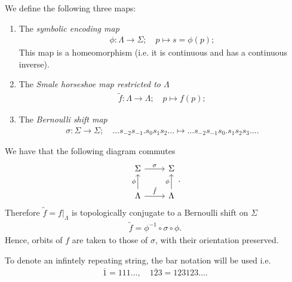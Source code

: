 \begin{definition}
	We define the following three maps:
	\begin{enumerate}
		
\item The \emph{symbolic encoding map}
	\begin{align}
		\boxed{
			\phi:\Lambda \to \Sigma;\quad p \mapsto s= \phi(p);
		}
	\end{align}
	This map is a homeomorphism (i.e. it is continuous and has a continuous inverse).

\item The \emph{Smale horseshoe map restricted to $\Lambda$}
	\begin{align}
		\boxed{
			\tilde{f}:\Lambda \to \Lambda;\quad p \mapsto f(p);
		}
	\end{align}
\item The \emph{Bernoulli shift map}
	\begin{align}
		\boxed{
			\sigma:\Sigma \to \Sigma;\quad
			\ldots s_{-2} s_{-1} \bm{.} s_0 s_1 s_2 \ldots 
			\mapsto
			\ldots s_{-2}s_{-1}s_{0}\bm{.} s_1 s_2 s_3 \ldots.
		}
	\end{align}
	
	\end{enumerate}
\end{definition}
We have that the following diagram commutes
\begin{equation}
\begin{tikzcd}
	\Sigma \arrow[r, "\sigma"] 
& \Sigma \\
\Lambda \arrow[u,"\phi"] \arrow[r, "\tilde{f}"]
& \Lambda \arrow[u, "\phi"] 
\end{tikzcd}.
\end{equation}
Therefore $\tilde{f} = \left. f\right|_{\Lambda}$ is topologically conjugate to a Bernoulli shift on $\Sigma$ 
	\begin{align}
		\tilde{f} = \phi^{-1} \circ \sigma \circ \phi.
	\end{align}
Hence, orbits of $f$ are taken to those of $\sigma$, with their orientation preserved.	

\begin{remark}[]
	To denote an infintely repeating string, the bar notation will be used i.e.
	\begin{align}
		\overline{1} = 111\ldots,\quad \overline{123}=123123\ldots.
	\end{align}
\end{remark}

